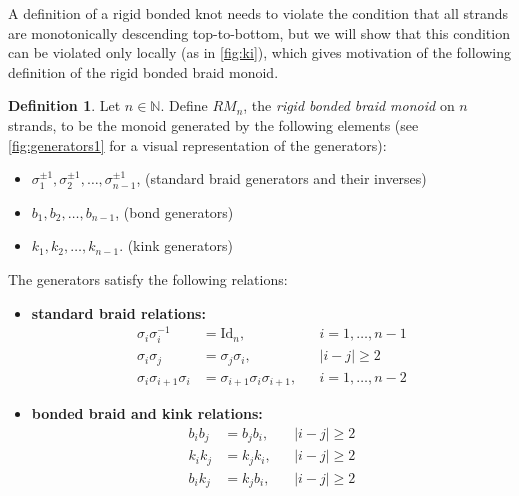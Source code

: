 \documentclass{article}
\theoremstyle{definition}
\newtheorem{definition}{Definition}[section]
\theoremstyle{plain}
\theoremstyle{remark}
\newcommand\id{\mathrm{Id}}
\begin{document}
A definition of a rigid bonded knot needs to violate the condition that all strands are monotonically descending top-to-bottom, but we will show that this condition can be violated only locally (as in \autoref{fig:ki}), which gives motivation of the following definition of the rigid bonded braid monoid.

\begin{definition}
Let $ n \in \mathbb{N} $. Define $ RM_n $, the \emph{rigid bonded braid monoid} on $ n $ strands, to be the monoid generated by the following elements (see \autoref{fig:generators1} for a visual representation of the generators):
\begin{itemize}
    \item $ \sigma_1^{\pm1}, \sigma_2^{\pm1}, \dots, \sigma_{n-1}^{\pm1}$, \hfill (standard braid generators and their inverses)
    \item $ b_1, b_2, \dots, b_{n-1}$, \hfill (bond generators)
    \item $ k_1, k_2, \dots, k_{n-1}$. \hfill (kink generators)
\end{itemize}


The generators satisfy the following relations:
\begin{itemize}
    \item \textbf{standard braid relations:}
    \begin{align*}
        \sigma_i \sigma_i^{-1} &= \id_n, &&  i = 1, \dots, n-1 \tag{R1} \\
        \sigma_i \sigma_j &= \sigma_j \sigma_i, &&  |i-j| \geq 2 \tag{R2} \\
        \sigma_i \sigma_{i+1} \sigma_i &= \sigma_{i+1} \sigma_i \sigma_{i+1}, &&  i = 1, \dots, n-2 \tag{R3}
    \end{align*}

    \item \textbf{bonded braid and kink relations:}
    \begin{align*}
        b_i b_j &= b_j b_i, &&  |i-j| \geq 2 \tag{B1} \\
        k_i k_j &= k_j k_i, &&  |i-j| \geq 2 \tag{K1} \\
        b_i k_j &= k_j b_i, &&  |i-j| \geq 2 \tag{BK1}
    \end{align*}


\end{itemize}
\end{definition}
\end{document}
